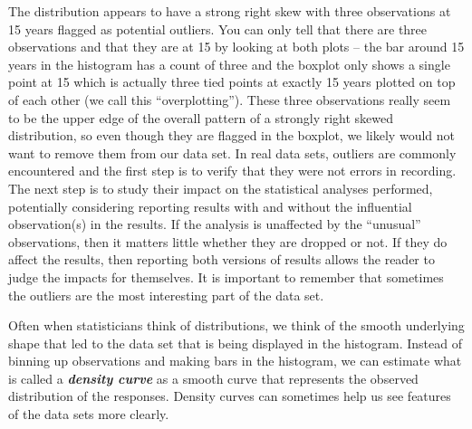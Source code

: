 \documentclass[]{book}
\begin{document}
The distribution appears to have a strong right skew with three
observations at 15 years flagged as potential outliers. You can only
tell that there are three observations and that they are at 15 by
looking at both plots -- the bar around 15 years in the histogram has a
count of three and the boxplot only shows a single point at 15 which is
actually three tied points at exactly 15 years plotted on top of each
other (we call this ``overplotting''). These three observations really
seem to be the upper edge of the overall pattern of a strongly right
skewed distribution, so even though they are flagged in the boxplot, we
likely would not want to remove them from our data set. In real data
sets, outliers are commonly encountered and the first step is to verify
that they were not errors in recording. The next step is to study their
impact on the statistical analyses performed, potentially considering
reporting results with and without the influential observation(s) in the
results. If the analysis is unaffected by the ``unusual'' observations,
then it matters little whether they are dropped or not. If they do
affect the results, then reporting both versions of results allows the
reader to judge the impacts for themselves. It is important to remember
that sometimes the outliers are the most interesting part of the data
set.

Often when statisticians think of distributions, we think of the smooth
underlying shape that led to the data set that is being displayed in the
histogram. Instead of binning up observations and making bars in the
histogram, we can estimate what is called a \textbf{\emph{density curve
}} as a smooth curve that represents the observed distribution of the
responses. Density curves can sometimes help us see features of the data
sets more clearly.
\end{document}
